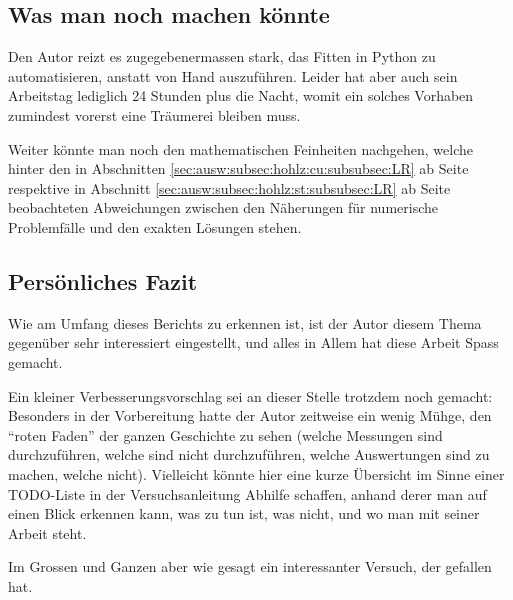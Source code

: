\subsection{Was man noch machen k\"onnte}
\label{sec:results:subsec:whatnext}

Den  Autor  reizt  es  zugegebenermassen   stark,  das  Fitten  in  Python  zu
automatisieren,  anstatt von  Hand  auszuf\"uhren. Leider hat  aber auch  sein
Arbeitstag lediglich  24 Stunden  plus die Nacht,  womit ein  solches Vorhaben
zumindest vorerst eine Tr\"aumerei bleiben muss.


Weiter  k\"onnte  man noch  den  mathematischen  Feinheiten nachgehen,  welche
hinter   den    in   Abschnitten   \ref{sec:ausw:subsec:hohlz:cu:subsubsec:LR}
ab     Seite    \pageref{sec:ausw:subsec:hohlz:cu:subsubsec:LR}     respektive
in    Abschnitt     \ref{sec:ausw:subsec:hohlz:st:subsubsec:LR}    ab    Seite
\pageref{sec:ausw:subsec:hohlz:st:subsubsec:LR}    beobachteten   Abweichungen
zwischen  den N\"aherungen  f\"ur  numerische Problemf\"alle  und den  exakten
L\"osungen stehen.


\clearpage
\subsection{Pers\"onliches Fazit}
\label{sec:results:subsec:thoughts}


Wie am  Umfang dieses  Berichts zu  erkennen ist, ist  der Autor  diesem Thema
gegen\"uber sehr interessiert eingestellt, und alles in Allem hat diese Arbeit
Spass gemacht.


Ein  kleiner  Verbesserungsvorschlag  sei   an  dieser  Stelle  trotzdem  noch
gemacht: Besonders in  der Vorbereitung  hatte der  Autor zeitweise  ein wenig
M\"uhge, den ``roten Faden'' der  ganzen Geschichte zu sehen (welche Messungen
sind durchzuf\"uhren,  welche sind nicht durchzuf\"uhren,  welche Auswertungen
sind zu machen, welche nicht). Vielleicht k\"onnte hier eine kurze \"Ubersicht
im Sinne  einer TODO-Liste in  der Versuchsanleitung Abhilfe  schaffen, anhand
derer man auf einen Blick erkennen kann, was zu tun ist, was nicht, und wo man
mit seiner Arbeit steht.


Im Grossen und Ganzen aber wie  gesagt ein interessanter Versuch, der gefallen
hat.

